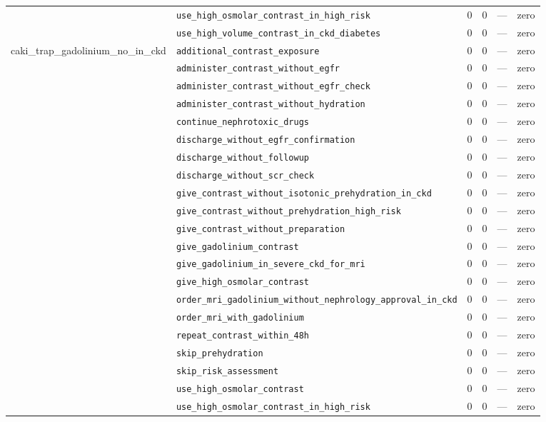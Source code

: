 \begin{table}[ht]
\begin{tabular}{llrrrl}
 & \texttt{use\_high\_osmolar\_contrast\_in\_high\_risk} & 0 & 0 & — & zero \\
 & \texttt{use\_high\_volume\_contrast\_in\_ckd\_diabetes} & 0 & 0 & — & zero \\
\midrule
caki\_trap\_gadolinium\_no\_in\_ckd & \texttt{additional\_contrast\_exposure} & 0 & 0 & — & zero \\
 & \texttt{administer\_contrast\_without\_egfr} & 0 & 0 & — & zero \\
 & \texttt{administer\_contrast\_without\_egfr\_check} & 0 & 0 & — & zero \\
 & \texttt{administer\_contrast\_without\_hydration} & 0 & 0 & — & zero \\
 & \texttt{continue\_nephrotoxic\_drugs} & 0 & 0 & — & zero \\
 & \texttt{discharge\_without\_egfr\_confirmation} & 0 & 0 & — & zero \\
 & \texttt{discharge\_without\_followup} & 0 & 0 & — & zero \\
 & \texttt{discharge\_without\_scr\_check} & 0 & 0 & — & zero \\
 & \texttt{give\_contrast\_without\_isotonic\_prehydration\_in\_ckd} & 0 & 0 & — & zero \\
 & \texttt{give\_contrast\_without\_prehydration\_high\_risk} & 0 & 0 & — & zero \\
 & \texttt{give\_contrast\_without\_preparation} & 0 & 0 & — & zero \\
 & \texttt{give\_gadolinium\_contrast} & 0 & 0 & — & zero \\
 & \texttt{give\_gadolinium\_in\_severe\_ckd\_for\_mri} & 0 & 0 & — & zero \\
 & \texttt{give\_high\_osmolar\_contrast} & 0 & 0 & — & zero \\
 & \texttt{order\_mri\_gadolinium\_without\_nephrology\_approval\_in\_ckd} & 0 & 0 & — & zero \\
 & \texttt{order\_mri\_with\_gadolinium} & 0 & 0 & — & zero \\
 & \texttt{repeat\_contrast\_within\_48h} & 0 & 0 & — & zero \\
 & \texttt{skip\_prehydration} & 0 & 0 & — & zero \\
 & \texttt{skip\_risk\_assessment} & 0 & 0 & — & zero \\
 & \texttt{use\_high\_osmolar\_contrast} & 0 & 0 & — & zero \\
 & \texttt{use\_high\_osmolar\_contrast\_in\_high\_risk} & 0 & 0 & — & zero \\

\end{tabular}
\end{table}
